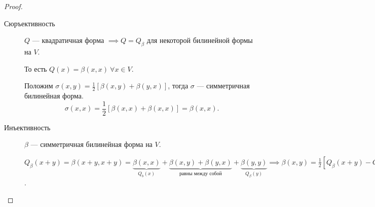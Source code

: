 \begin{proof}~
    \begin{description}
    \item[Сюръективность] $Q$ --- квадратичная форма $ \implies Q = Q_\beta$ для некоторой билинейной формы на $V$.

        То есть $Q(x) = \beta(x, x) \ \forall x \in V$.

        Положим $\sigma(x, y) = \frac{1}{2} \left[\beta(x, y) + \beta(y, x)\right]$, тогда $\sigma$ --- симметричная билинейная форма.
        \begin{equation*}
            \sigma(x, x) = \frac{1}{2}\left[\beta(x, x) + \beta(x, x)\right] = \beta(x, x)
        .\end{equation*}

    \item[Инъективность] $\beta$ --- симметричная билинейная форма на $V$.

        $Q_\beta(x + y) = \beta(x + y, x + y) = \underbrace{\beta(x, x)}_{Q_b(x)} + \underbrace{\beta(x, y) + \beta(y, x)}_{\text{равны между собой}} + \underbrace{\beta(y, y)}_{Q_\beta(y)} \implies \beta(x, y) = \frac{1}{2} \left[Q_\beta(x + y) - Q_\beta(x) - Q_\beta(y)\right]$.
    \end{description}
\end{proof}

